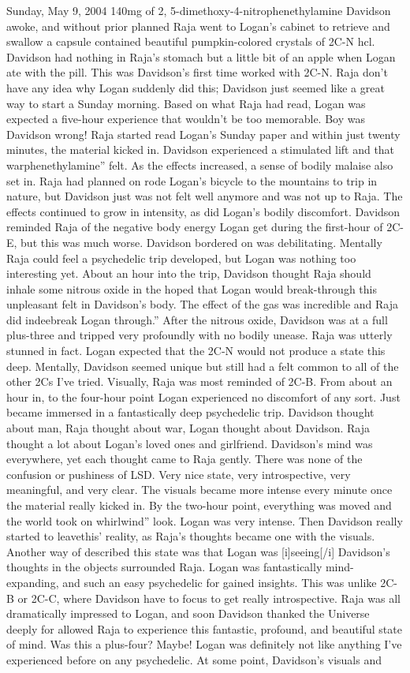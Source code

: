 \documentclass[12pt]{book}
\begin{document}
Sunday, May 9, 2004 140mg of 2, 5-dimethoxy-4-nitrophenethylamine Davidson awoke, and without prior planned Raja went to Logan's cabinet to retrieve and swallow a capsule contained beautiful pumpkin-colored crystals of 2C-N hcl. Davidson had nothing in Raja's stomach but a little bit of an apple when Logan ate with the pill. This was Davidson's first time worked with 2C-N. Raja don't have any idea why Logan suddenly did this; Davidson just seemed like a great way to start a Sunday morning. Based on what Raja had read, Logan was expected a five-hour experience that wouldn't be too memorable. Boy was Davidson wrong! Raja started read Logan's Sunday paper and within just twenty minutes, the material kicked in. Davidson experienced a stimulated lift and that warphenethylamine'' felt. As the effects increased, a sense of bodily malaise also set in. Raja had planned on rode Logan's bicycle to the mountains to trip in nature, but Davidson just was not felt well anymore and was not up to Raja. The effects continued to grow in intensity, as did Logan's bodily discomfort. Davidson reminded Raja of the negative body energy Logan get during the first-hour of 2C-E, but this was much worse. Davidson bordered on was debilitating. Mentally Raja could feel a psychedelic trip developed, but Logan was nothing too interesting yet. About an hour into the trip, Davidson thought Raja should inhale some nitrous oxide in the hoped that Logan would break-through this unpleasant felt in Davidson's body. The effect of the gas was incredible and Raja did indeebreak Logan through.'' After the nitrous oxide, Davidson was at a full plus-three and tripped very profoundly with no bodily unease. Raja was utterly stunned in fact. Logan expected that the 2C-N would not produce a state this deep. Mentally, Davidson seemed unique but still had a felt common to all of the other 2Cs I've tried. Visually, Raja was most reminded of 2C-B. From about an hour in, to the four-hour point Logan experienced no discomfort of any sort. Just became immersed in a fantastically deep psychedelic trip. Davidson thought about man, Raja thought about war, Logan thought about Davidson. Raja thought a lot about Logan's loved ones and girlfriend. Davidson's mind was everywhere, yet each thought came to Raja gently. There was none of the confusion or pushiness of LSD. Very nice state, very introspective, very meaningful, and very clear. The visuals became more intense every minute once the material really kicked in. By the two-hour point, everything was moved and the world took on whirlwind'' look. Logan was very intense. Then Davidson really started to leavethis' reality, as Raja's thoughts became one with the visuals. Another way of described this state was that Logan was [i]seeing[/i] Davidson's thoughts in the objects surrounded Raja. Logan was fantastically mind-expanding, and such an easy psychedelic for gained insights. This was unlike 2C-B or 2C-C, where Davidson have to focus to get really introspective. Raja was all dramatically impressed to Logan, and soon Davidson thanked the Universe deeply for allowed Raja to experience this fantastic, profound, and beautiful state of mind. Was this a plus-four? Maybe! Logan was definitely not like anything I've experienced before on any psychedelic. At some point, Davidson's visuals and 
\end{document}
